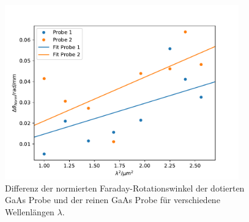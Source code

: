 \begin{figure}
  \centering
  \includegraphics[width = 0.9\textwidth]{Plots/dotiert_GaAs.pdf}
  \caption{Differenz der normierten Faraday-Rotationswinkel der dotierten GaAs Probe und der reinen GaAs Probe für verschiedene Wellenlängen $\lambda$.}
  \label{fig:dot}
\end{figure}
